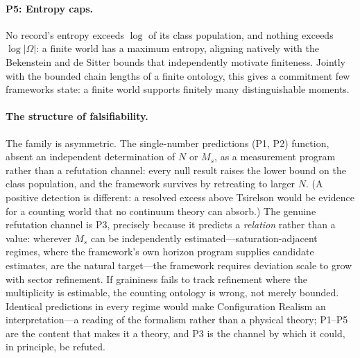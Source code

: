 \documentclass[11pt]{article}
\theoremstyle{definition}
\theoremstyle{remark}
\begin{document}
\paragraph{P5: Entropy caps.} No record's entropy exceeds $\log$ of its class population, and nothing exceeds $\log|\Omega|$: a finite world has a maximum entropy, aligning natively with the Bekenstein and de Sitter bounds that independently motivate finiteness. Jointly with the bounded chain lengths of a finite ontology, this gives a commitment few frameworks state: a finite world supports finitely many distinguishable moments.

\paragraph{The structure of falsifiability.} The family is asymmetric. The single-number predictions (P1, P2) function, absent an independent determination of $N$ or $M_s$, as a measurement program rather than a refutation channel: every null result raises the lower bound on the class population, and the framework survives by retreating to larger $N$. (A positive detection is different: a resolved excess above Tsirelson would be evidence for a counting world that no continuum theory can absorb.) The genuine refutation channel is P3, precisely because it predicts a \emph{relation} rather than a value: wherever $M_s$ can be independently estimated---saturation-adjacent regimes, where the framework's own horizon program supplies candidate estimates, are the natural target---the framework requires deviation scale to grow with sector refinement. If graininess fails to track refinement where the multiplicity is estimable, the counting ontology is wrong, not merely bounded. Identical predictions in every regime would make Configuration Realism an interpretation---a reading of the formalism rather than a physical theory; P1--P5 are the content that makes it a theory, and P3 is the channel by which it could, in principle, be refuted.
\end{document}
